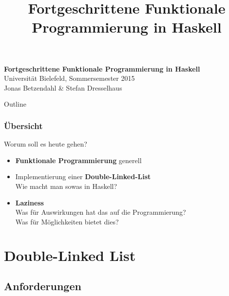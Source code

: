 \documentclass{beamer}
\title{Fortgeschrittene Funktionale Programmierung in Haskell}
\begin{document}
  

  \begin{frame}
  \begin{center}
    \huge\textbf{Fortgeschrittene Funktionale Programmierung in Haskell}\\ \bigskip
    \LARGE Universität Bielefeld, Sommersemester 2015\\ \bigskip
    \large Jonas Betzendahl \& Stefan Dresselhaus
    \end{center}
  \end{frame}

\begin{frame}[allowframebreaks]{Outline}
\frametitle{Übersicht}
\tableofcontents[hideallsubsections]
\end{frame}

\begin{frame}
Worum soll es heute gehen?\bigskip

\begin{itemize}
 \item \textbf{Funktionale Programmierung} generell
 \pause
 \item Implementierung einer \textbf{Double-Linked-List}\\
       Wie macht man sowas in Haskell?
 \pause
 \item \textbf{Laziness}\\
       Was für Auswirkungen hat das auf die Programmierung?\\
       Was für Möglichkeiten bietet dies?
\end{itemize}

\end{frame}


\section{Double-Linked List}

\subsection{Anforderungen}
\end{document}
